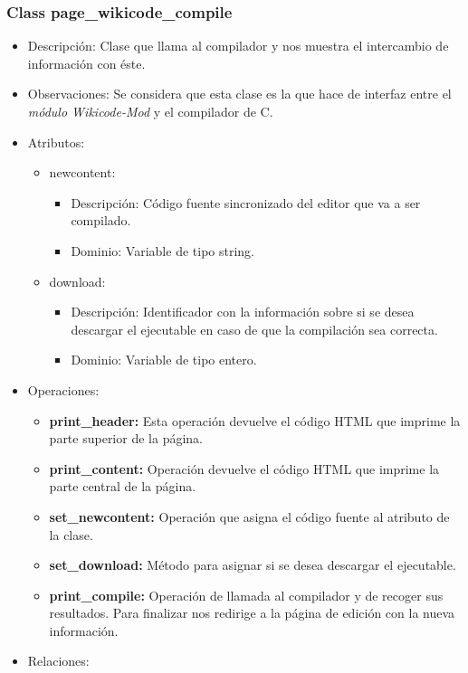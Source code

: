 \subsubsection{Class page\_wikicode\_compile}

\begin{itemize}
	\item Descripción: Clase que llama al compilador y nos muestra el intercambio de información con éste.
	\item Observaciones: Se considera que esta clase es la que hace de interfaz entre el \emph{módulo Wikicode-Mod} y el compilador de C.
	\item Atributos:
		\begin{itemize}
			\item newcontent:
				\begin{itemize}
					\item Descripción: Código fuente sincronizado del editor que va a ser compilado.
					\item Dominio: Variable de tipo string.
				\end{itemize}
			\item download:
				\begin{itemize}
					\item Descripción: Identificador con la información sobre si se desea descargar el ejecutable en caso de que la compilación sea correcta.
					\item Dominio: Variable de tipo entero.
				\end{itemize}
		\end{itemize}
	\item Operaciones:
		\begin{itemize}
			\item \textbf{print\_header: }Esta operación devuelve el código HTML que imprime la parte superior de la página.
			\item \textbf{print\_content: }Operación devuelve el código HTML que imprime la parte central de la página.
			\item \textbf{set\_newcontent: }Operación que asigna el código fuente al atributo de la clase.
			\item \textbf{set\_download: }Método para asignar si se desea descargar el ejecutable.
			\item \textbf{print\_compile: }Operación de llamada al compilador y de recoger sus resultados. Para finalizar nos redirige a la página de edición con la nueva información.
		\end{itemize}
	\item Relaciones:

\end{itemize}
